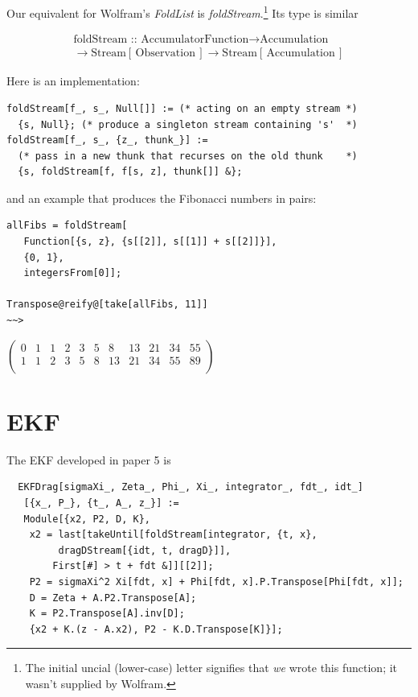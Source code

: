\documentclass[10pt,oneside,x11names]{article}
\begin{document}
Our equivalent for Wolfram's \emph{FoldList} is \emph{foldStream}.\footnote{The initial uncial (lower-case) letter signifies that \emph{we} wrote this function; it wasn't supplied by Wolfram.} Its type is similar

\begin{align*}
\text{foldStream :: }
\text{AccumulatorFunction}
\rightarrow
\text{Accumulation}\\
\rightarrow
\text{Stream}\left[\,\text{Observation}\,\right]
\rightarrow
\text{Stream}\left[\,\text{Accumulation}\,\right]
\end{align*}

\noindent Here is an implementation:

\begin{verbatim}
foldStream[f_, s_, Null[]] := (* acting on an empty stream *)
  {s, Null}; (* produce a singleton stream containing 's'  *)
foldStream[f_, s_, {z_, thunk_}] :=
  (* pass in a new thunk that recurses on the old thunk    *)
  {s, foldStream[f, f[s, z], thunk[]] &};
\end{verbatim}

\noindent and an example that produces the Fibonacci numbers in pairs:

\begin{verbatim}
allFibs = foldStream[
   Function[{s, z}, {s[[2]], s[[1]] + s[[2]]}],
   {0, 1},
   integersFrom[0]];

Transpose@reify@[take[allFibs, 11]]
~~>
\end{verbatim}
\(
\left(
\begin{array}{ccccccccccc}
 0 & 1 & 1 & 2 & 3 & 5 & 8 & 13 & 21 & 34 & 55 \\
 1 & 1 & 2 & 3 & 5 & 8 & 13 & 21 & 34 & 55 & 89 \\
\end{array}
\right)
\)

\section{EKF}
\label{sec:orgheadline13}

The EKF developed in paper 5 is

\begin{verbatim}
  EKFDrag[sigmaXi_, Zeta_, Phi_, Xi_, integrator_, fdt_, idt_]
   [{x_, P_}, {t_, A_, z_}] :=
   Module[{x2, P2, D, K},
    x2 = last[takeUntil[foldStream[integrator, {t, x},
         dragDStream[{idt, t, dragD}]],
        First[#] > t + fdt &]][[2]];
    P2 = sigmaXi^2 Xi[fdt, x] + Phi[fdt, x].P.Transpose[Phi[fdt, x]];
    D = Zeta + A.P2.Transpose[A];
    K = P2.Transpose[A].inv[D];
    {x2 + K.(z - A.x2), P2 - K.D.Transpose[K]}];
\end{verbatim}
\end{document}
